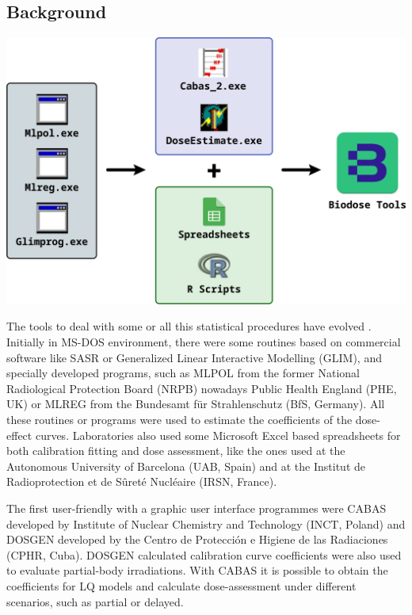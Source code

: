\documentclass[]{scrartcl}
\begin{document}
\hypertarget{intro-background}{%
\subsection{Background}\label{intro-background}}

\begin{center}\includegraphics[width=0.75\linewidth]{images/intro/chronology} \end{center}

The tools to deal with some or all this statistical procedures have evolved \citep{Ainsbury2009}. Initially in MS-DOS environment, there were some routines based on commercial software like SASR or Generalized Linear Interactive Modelling (GLIM), and specially developed programs, such as MLPOL from the former National Radiological Protection Board (NRPB) nowadays Public Health England (PHE, UK) or MLREG from the Bundesamt für Strahlenschutz (BfS, Germany). All these routines or programs were used to estimate the coefficients of the dose-effect curves. Laboratories also used some Microsoft Excel based spreadsheets for both calibration fitting and dose assessment, like the ones used at the Autonomous University of Barcelona (UAB, Spain) and at the Institut de Radioprotection et de Sûreté Nucléaire (IRSN, France).

The first user-friendly with a graphic user interface programmes were CABAS \citep{Deperas2007} developed by Institute of Nuclear Chemistry and Technology (INCT, Poland) and DOSGEN \citep{Valdes2010} developed by the Centro de Protección e Higiene de las Radiaciones (CPHR, Cuba). DOSGEN calculated calibration curve coefficients were also used to evaluate partial-body irradiations. With CABAS it is possible to obtain the coefficients for LQ models and calculate dose-assessment under different scenarios, such as partial or delayed.
\end{document}
